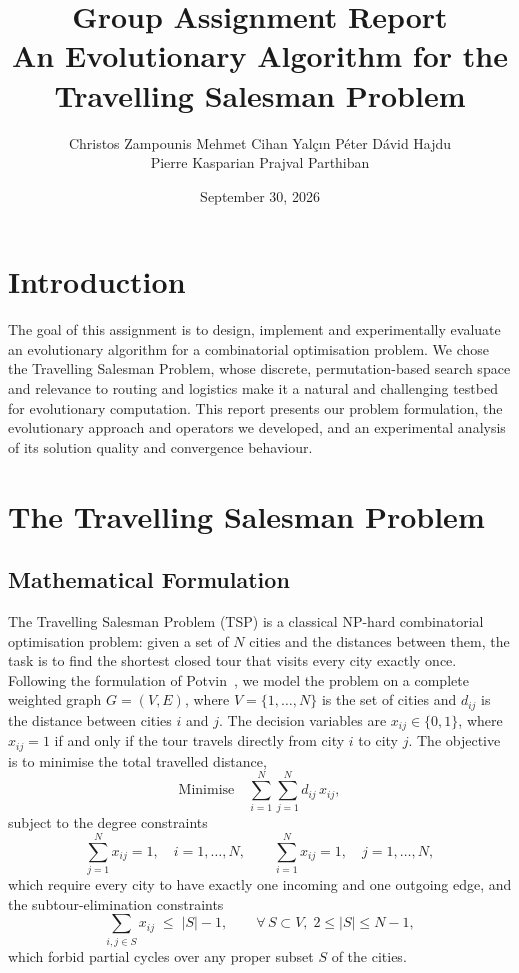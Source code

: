 \documentclass[11pt,a4paper]{article}
\title{Group \groupnumber{} Assignment Report\\[0.2em]
  \large An Evolutionary Algorithm for the Travelling Salesman Problem}
\author{%
  Christos Zampounis \quad Mehmet Cihan Yal\c{c}\i n \quad P\'eter D\'avid Hajdu\\[0.3em]
  Pierre Kasparian \quad Prajval Parthiban}
\date{September 30, 2026}
\begin{document}
\maketitle
\thispagestyle{plain}

\section{Introduction}
The goal of this assignment is to design, implement and experimentally evaluate
an evolutionary algorithm for a combinatorial optimisation problem. We chose the
Travelling Salesman Problem, whose discrete, permutation-based search space and
relevance to routing and logistics make it a natural and challenging testbed for
evolutionary computation. This report presents our problem formulation, the
evolutionary approach and operators we developed, and an experimental analysis
of its solution quality and convergence behaviour.

\section{The Travelling Salesman Problem}

\subsection{Mathematical Formulation}

The Travelling Salesman Problem (TSP) is a classical NP-hard combinatorial
optimisation problem: given a set of $N$ cities and the distances between them,
the task is to find the shortest closed tour that visits every city exactly
once.
Following the formulation of Potvin~\cite{potvin1996}, we model the problem
on a complete weighted graph $G=(V,E)$, where $V=\{1,\dots,N\}$ is the set of
cities and $d_{ij}$ is the distance between cities $i$ and $j$. The decision
variables are $x_{ij}\in\{0,1\}$, where $x_{ij}=1$ if and only if the tour
travels directly from city $i$ to city $j$. The objective is to minimise the
total travelled distance,
\begin{equation}
  \text{Minimise} \quad \sum_{i=1}^{N}\sum_{j=1}^{N} d_{ij}\,x_{ij},
  \label{eq:tsp_objective}
\end{equation}
subject to the degree constraints
\begin{equation}
  \sum_{j=1}^{N} x_{ij}=1, \quad i=1,\dots,N,
  \qquad
  \sum_{i=1}^{N} x_{ij}=1, \quad j=1,\dots,N,
  \label{eq:tsp_degree}
\end{equation}
which require every city to have exactly one incoming and one outgoing edge,
and the subtour-elimination constraints
\begin{equation}
  \sum_{i,j\in S} x_{ij} \;\le\; |S|-1,
  \qquad \forall\, S\subset V,\; 2\le |S|\le N-1,
  \label{eq:tsp_subtour}
\end{equation}
which forbid partial cycles over any proper subset $S$ of the cities.
\end{document}
